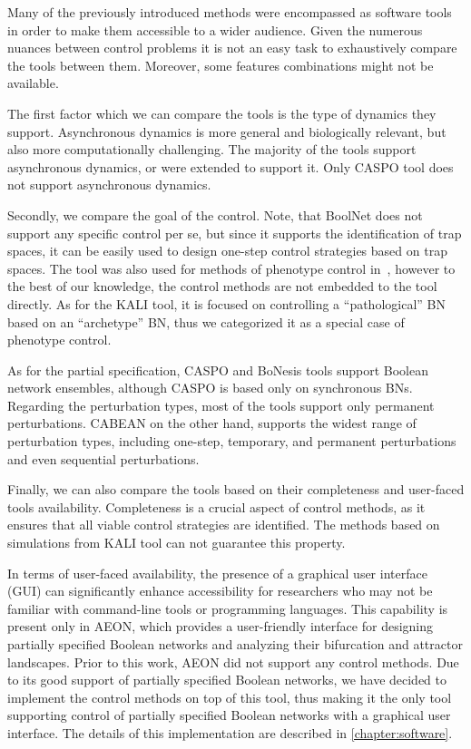 Many of the previously introduced methods were encompassed as software tools in order to make them accessible to a wider audience. Given the numerous nuances between control problems it is not an easy task to exhaustively compare the tools between them. Moreover, some features combinations might not be available. 

The first factor which we can compare the tools is the type of dynamics they support. Asynchronous dynamics is more general and biologically relevant, but also more computationally challenging. The majority of the tools support asynchronous dynamics, or were extended to support it. Only CASPO tool does not support asynchronous dynamics. 

Secondly, we compare the goal of the control. Note, that BoolNet does not support any specific control per se, but since it supports the identification of trap spaces, it can be easily used to design one-step control strategies based on trap spaces. The tool was also used for methods of phenotype control in~\cite{Fontanals2023}, however to the best of our knowledge, the control methods are not embedded to the tool directly. As for the KALI tool, it is focused on controlling a ``pathological'' BN based on an ``archetype'' BN, thus we categorized it as a special case of phenotype control.

As for the partial specification, CASPO and BoNesis tools support Boolean network ensembles, although CASPO is based only on synchronous BNs. Regarding the perturbation types, most of the tools support only permanent perturbations. CABEAN on the other hand, supports the widest range of perturbation types, including one-step, temporary, and permanent perturbations and even sequential perturbations.

Finally, we can also compare the tools based on their completeness and user-faced tools availability. Completeness is a crucial aspect of control methods, as it ensures that all viable control strategies are identified. The methods based on simulations from KALI tool can not guarantee this property.

In terms of user-faced availability, the presence of a graphical user interface (GUI) can significantly enhance accessibility for researchers who may not be familiar with command-line tools or programming languages. This capability is present only in AEON, which provides a user-friendly interface for designing partially specified Boolean networks and analyzing their bifurcation and attractor landscapes. Prior to this work, AEON did not support any control methods. Due to its good support of partially specified Boolean networks, we have decided to implement the control methods on top of this tool, thus making it the only tool supporting control of partially specified Boolean networks with a graphical user interface. The details of this implementation are described in \autoref{chapter:software}.

